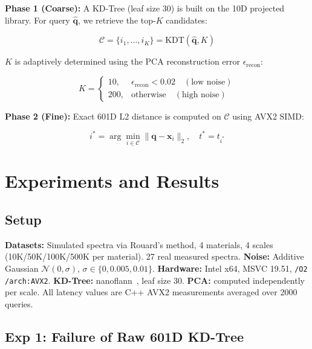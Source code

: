 \documentclass[final,5p,times]{elsarticle}
\begin{document}
\textbf{Phase 1 (Coarse):} A KD-Tree (leaf size 30) is built on the 10D projected library. For query $\hat{\mathbf{q}}$, we retrieve the top-$K$ candidates:

\begin{equation}
\mathcal{C} = \{i_1, \ldots, i_K\} = \text{KDT}(\hat{\mathbf{q}}, K)
\label{eq:kdt_search}
\end{equation}

$K$ is adaptively determined using the PCA reconstruction error $\epsilon_{\text{recon}}$:

\begin{equation}
K = \begin{cases}
10, & \epsilon_{\text{recon}} < 0.02 \quad (\text{low noise})\\
200, & \text{otherwise} \quad (\text{high noise})
\end{cases}
\label{eq:adaptive_k}
\end{equation}

\textbf{Phase 2 (Fine):} Exact 601D L2 distance is computed on $\mathcal{C}$ using AVX2 SIMD:

\begin{equation}
i^* = \arg\min_{i \in \mathcal{C}} \|\mathbf{q} - \mathbf{x}_i\|_2, \quad t^* = t_{i^*}
\label{eq:rerank}
\end{equation}

\section{Experiments and Results}
\label{sec:exp}

\subsection{Setup}

\textbf{Datasets:} Simulated spectra via Rouard's method, 4 materials, 4 scales (10K/50K/100K/500K per material). 27 real measured spectra. \textbf{Noise:} Additive Gaussian $\mathcal{N}(0,\sigma)$, $\sigma \in \{0,0.005,0.01\}$. \textbf{Hardware:} Intel x64, MSVC 19.51, \texttt{/O2 /arch:AVX2}. \textbf{KD-Tree:} nanoflann~\cite{blanco2014}, leaf size 30. \textbf{PCA:} computed independently per scale. All latency values are C++ AVX2 measurements averaged over 2000 queries.

\subsection{Exp 1: Failure of Raw 601D KD-Tree}
\end{document}
